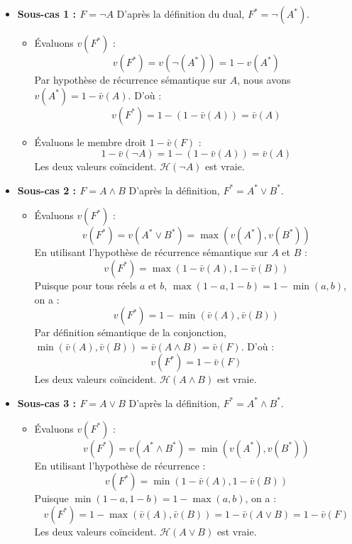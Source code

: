 \documentclass[11pt,a4paper]{article}
\begin{document}
\begin{itemize}
\tightlist
\item
  \textbf{Sous-cas 1 : \(F = \neg A\)} D'après la définition du dual,
  \(F^* = \neg(A^*)\).

  \begin{itemize}
  \tightlist
  \item
    Évaluons \(v(F^*)\) : \[v(F^*) = v(\neg (A^*)) = 1 - v(A^*)\] Par
    hypothèse de récurrence sémantique sur \(A\), nous avons
    \(v(A^*) = 1 - \bar{v}(A)\). D'où :
    \[v(F^*) = 1 - (1 - \bar{v}(A)) = \bar{v}(A)\]
  \item
    Évaluons le membre droit \(1 - \bar{v}(F)\) :
    \[1 - \bar{v}(\neg A) = 1 - (1 - \bar{v}(A)) = \bar{v}(A)\] Les deux
    valeurs coïncident. \(\mathcal{H}(\neg A)\) est vraie.
  \end{itemize}
\item
  \textbf{Sous-cas 2 : \(F = A \land B\)} D'après la définition,
  \(F^* = A^* \lor B^*\).

  \begin{itemize}
  \tightlist
  \item
    Évaluons \(v(F^*)\) :
    \[v(F^*) = v(A^* \lor B^*) = \max(v(A^*), v(B^*))\] En utilisant
    l'hypothèse de récurrence sémantique sur \(A\) et \(B\) :
    \[v(F^*) = \max(1 - \bar{v}(A), 1 - \bar{v}(B))\] Puisque pour tous
    réels \(a\) et \(b\), \(\max(1-a, 1-b) = 1 - \min(a, b)\), on a :
    \[v(F^*) = 1 - \min(\bar{v}(A), \bar{v}(B))\] Par définition
    sémantique de la conjonction,
    \(\min(\bar{v}(A), \bar{v}(B)) = \bar{v}(A \land B) = \bar{v}(F)\).
    D'où : \[v(F^*) = 1 - \bar{v}(F)\] Les deux valeurs coïncident.
    \(\mathcal{H}(A \land B)\) est vraie.
  \end{itemize}
\item
  \textbf{Sous-cas 3 : \(F = A \lor B\)} D'après la définition,
  \(F^* = A^* \land B^*\).

  \begin{itemize}
  \tightlist
  \item
    Évaluons \(v(F^*)\) :
    \[v(F^*) = v(A^* \land B^*) = \min(v(A^*), v(B^*))\] En utilisant
    l'hypothèse de récurrence :
    \[v(F^*) = \min(1 - \bar{v}(A), 1 - \bar{v}(B))\] Puisque
    \(\min(1-a, 1-b) = 1 - \max(a, b)\), on a :
    \[v(F^*) = 1 - \max(\bar{v}(A), \bar{v}(B)) = 1 - \bar{v}(A \lor B) = 1 - \bar{v}(F)\]
    Les deux valeurs coïncident. \(\mathcal{H}(A \lor B)\) est vraie.
  \end{itemize}
\end{itemize}
\end{document}
